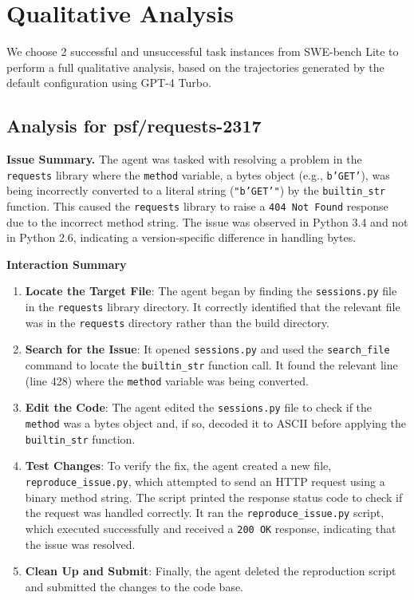 \section{Qualitative Analysis}
\label{appx:qualitative_analysis}

We choose \num{2} successful and unsuccessful task instances from SWE-bench Lite to perform a full qualitative analysis, based on the trajectories generated by the default configuration using GPT-4 Turbo.

\subsection*{Analysis for psf/requests-2317}
\textbf{Issue Summary.}
The agent was tasked with resolving a problem in the \texttt{requests} library where the \texttt{method} variable, a bytes object (e.g., \texttt{b'GET'}), was being incorrectly converted to a literal string (\texttt{"b'GET'"}) by the \texttt{builtin\_str} function.
This caused the \texttt{requests} library to raise a \texttt{404 Not Found} response due to the incorrect method string.
The issue was observed in Python 3.4 and not in Python 2.6, indicating a version-specific difference in handling bytes.

\textbf{Interaction Summary}

\begin{enumerate}
    \item \textbf{Locate the Target File}: The agent began by finding the \texttt{sessions.py} file in the \texttt{requests} library directory.
    It correctly identified that the relevant file was in the \texttt{requests} directory rather than the build directory.
    
    \item \textbf{Search for the Issue}: It opened \texttt{sessions.py} and used the \texttt{search\_file} command to locate the \texttt{builtin\_str} function call.
    It found the relevant line (line 428) where the \texttt{method} variable was being converted.
    
    \item \textbf{Edit the Code}: The agent edited the \texttt{sessions.py} file to check if the \texttt{method} was a bytes object and, if so, decoded it to ASCII before applying the \texttt{builtin\_str} function.
    
    \item \textbf{Test Changes}: To verify the fix, the agent created a new file, \texttt{reproduce\_issue.py}, which attempted to send an HTTP request using a binary method string.
    The script printed the response status code to check if the request was handled correctly.
    It ran the \texttt{reproduce\_issue.py} script, which executed successfully and received a \texttt{200 OK} response, indicating that the issue was resolved.
    
    \item \textbf{Clean Up and Submit}: Finally, the agent deleted the reproduction script and submitted the changes to the code base.
\end{enumerate}

